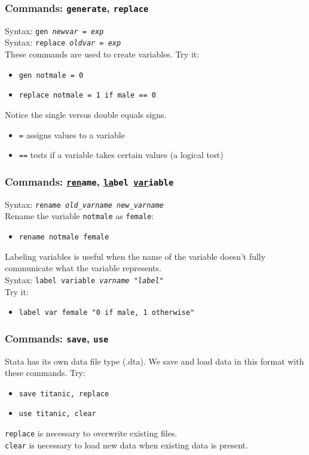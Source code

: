 \documentclass[11pt]{beamer}
\begin{document}
\begin{frame}
\frametitle{Commands: \texttt{\underline{g}enerate}, \texttt{replace}}
Syntax: \texttt{gen \textit{newvar} = \textit{exp}} \\ \medskip
Syntax: \texttt{replace \textit{oldvar} = \textit{exp}} \\ \bigskip
These commands are used to create variables. \pause Try it:
\begin{itemize}
	\item \texttt{gen notmale = 0}
	\item \texttt{replace notmale = 1 if male == 0}
\end{itemize} \bigskip \pause
Notice the single versus double equals signs. 
\begin{itemize}
	\item \texttt{=} assigns values to a variable
	\item \texttt{==} tests if a variable takes certain values (a logical test)
\end{itemize}
\end{frame}

\begin{frame}
\frametitle{Commands: \texttt{\underline{ren}ame}, \texttt{\underline{la}bel \underline{var}iable}}
Syntax: \texttt{rename \textit{old\_varname} \textit{new\_varname}} \\ \medskip
\pause Rename the variable \texttt{notmale} as \texttt{female}:
\begin{itemize}
	\item \texttt{rename notmale female}
\end{itemize} \bigskip \bigskip \pause

Labeling variables is useful when the name of the variable doesn't fully communicate what the variable represents. \\ \medskip
Syntax: \texttt{label variable \textit{varname} \textit{"label"}} \\ \pause \medskip
Try it:
\begin{itemize}
	\item \texttt{label var female "0 if male, 1 otherwise"}
\end{itemize} \bigskip \bigskip \pause
\end{frame}

\begin{frame}
\frametitle{Commands: \texttt{save}, \texttt{use}}
Stata has its own data file type (.dta). We save and load data in this format with these commands. \pause Try:
\begin{itemize}
	\item \texttt{save titanic, replace}
	\item \texttt{use titanic, clear}
\end{itemize} \bigskip \pause
\texttt{replace} is necessary to overwrite existing files. \pause \\ \bigskip
\texttt{clear} is necessary to load new data when existing data is present. 
\end{frame}
\end{document}
